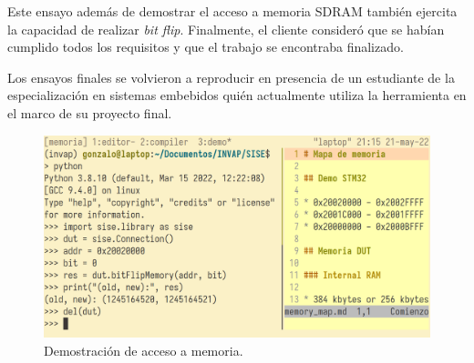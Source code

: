 Este ensayo además de demostrar el acceso a memoria SDRAM también ejercita la capacidad de realizar \emph{bit flip}.
Finalmente, el cliente consideró que se habían cumplido todos los requisitos y que el trabajo se encontraba finalizado.

Los ensayos finales se volvieron a reproducir en presencia de un estudiante de la especialización en sistemas embebidos quién actualmente utiliza la herramienta en el marco de su proyecto final.

\begin{figure}[htbp]
	\centering
	\includegraphics[width=\textwidth]{./Figures/demo_bitflip.png}
    \caption{Demostración de acceso a memoria.}
	\label{fig:demobitflip}
\end{figure}
